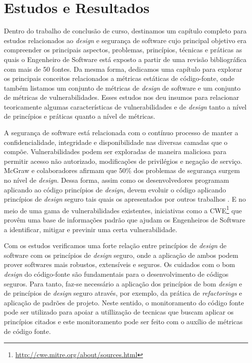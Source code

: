 \section{Estudos e Resultados}
\label{sec:studies}

Dentro do trabalho de conclusão de curso, destinamos um capítulo completo para estudos relacionados ao \emph{design} e segurança de software cujo principal objetivo era compreender os principais aspectos, problemas, princípios, técnicas e práticas as quais o Engenheiro de Software está exposto a partir de uma revisão bibliográfica com mais de 50 fontes. Da mesma forma, dedicamos uma capítulo para explorar os principais conceitos relacionados a métricas estáticas de código-fonte, onde também listamos um conjunto de métricas de \emph{design} de software e um conjunto de métricas de vulnerabilidades. Esses estudos nos deu insumos para relacionar teoricamente algumas características de vulnerabilidades e de \emph{design} tanto a nível de princípios e práticas quanto a nível de métricas.

A segurança de software está relacionada com o contínuo processo de manter a confidencialidade, integridade e disponibilidade nas diversas camadas que o compõe. Vulnerabilidades podem ser exploradas de maneira maliciosa para permitir acesso não autorizado, modificações de privilégios e negação de serviço. McGraw e colaboradores \cite{mcgraw2004} afirmam que 50\% dos problemas de segurança surgem no nível de \emph{design}. Dessa forma, assim como os desenvolvedores programam aplicando ao código princípios de \emph{design}, devem evoluir o código aplicando princípios de \emph{design} seguro tais quais os apresentados por outros trabalhos \cite{saltzer1975} \cite{bishop2003} \cite{mcgraw2002}. E no meio de uma gama de vulnerabilidades existentes, iniciativas como a CWE\footnote{\url{http://cwe.mitre.org/about/sources.html}} que provêm uma base de informações padrão que ajudam os Engenheiros de Software a identificar, mitigar e previnir uma certa vulnerabilidade.


Com os estudos verificamos uma forte relação entre princípios de \emph{design} de software com os princípios de \emph{design} seguro, onde a aplicação de ambos podem prover softwares mais robustos, extensíveis e seguros. Os cuidados com o bom \emph{design} do código-fonte são fundamentais para o desenvolvimento de códigos seguros. Para tanto, faz-se necessário a aplicação dos princípios de bom \emph{design} e de princípios de \emph{design} seguro através, por exemplo, da prática de \emph{refactorings} e aplicação de padrões de projeto. Neste sentido, o monitoramento do código fonte pode ser utilizado para apoiar a utillização de tecnicas que buscam aplicar os princípios citados e este monitoramento pode ser feito com o auxílio de métricas de código fonte.


